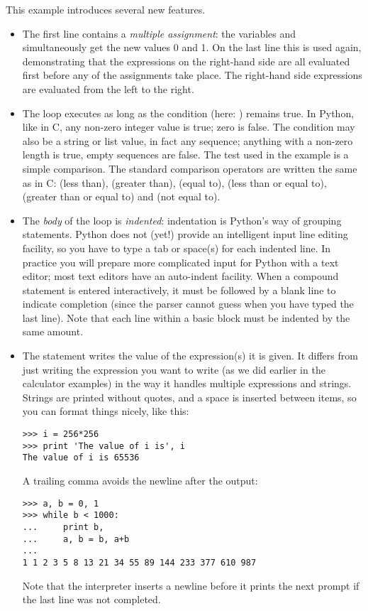 \documentclass{manual}
\begin{document}
This example introduces several new features.

\begin{itemize}

\item
The first line contains a \emph{multiple assignment}: the variables
 and  simultaneously get the new values 0 and 1.  On the
last line this is used again, demonstrating that the expressions on
the right-hand side are all evaluated first before any of the
assignments take place.  The right-hand side expressions are evaluated 
from the left to the right.

\item
The  loop executes as long as the condition (here:
) remains true.  In Python, like in C, any non-zero
integer value is true; zero is false.  The condition may also be a
string or list value, in fact any sequence; anything with a non-zero
length is true, empty sequences are false.  The test used in the
example is a simple comparison.  The standard comparison operators are
written the same as in C: \code{<} (less than), \code{>} (greater than),
\code{==} (equal to), \code{<=} (less than or equal to),
\code{>=} (greater than or equal to) and \code{!=} (not equal to).

\item
The \emph{body} of the loop is \emph{indented}: indentation is Python's
way of grouping statements.  Python does not (yet!) provide an
intelligent input line editing facility, so you have to type a tab or
space(s) for each indented line.  In practice you will prepare more
complicated input for Python with a text editor; most text editors have
an auto-indent facility.  When a compound statement is entered
interactively, it must be followed by a blank line to indicate
completion (since the parser cannot guess when you have typed the last
line).  Note that each line within a basic block must be indented by
the same amount.

\item
The  statement writes the value of the expression(s) it is
given.  It differs from just writing the expression you want to write
(as we did earlier in the calculator examples) in the way it handles
multiple expressions and strings.  Strings are printed without quotes,
and a space is inserted between items, so you can format things nicely,
like this:

\begin{verbatim}
>>> i = 256*256
>>> print 'The value of i is', i
The value of i is 65536
\end{verbatim}

A trailing comma avoids the newline after the output:

\begin{verbatim}
>>> a, b = 0, 1
>>> while b < 1000:
...     print b,
...     a, b = b, a+b
... 
1 1 2 3 5 8 13 21 34 55 89 144 233 377 610 987
\end{verbatim}

Note that the interpreter inserts a newline before it prints the next
prompt if the last line was not completed.

\end{itemize}
\end{document}

